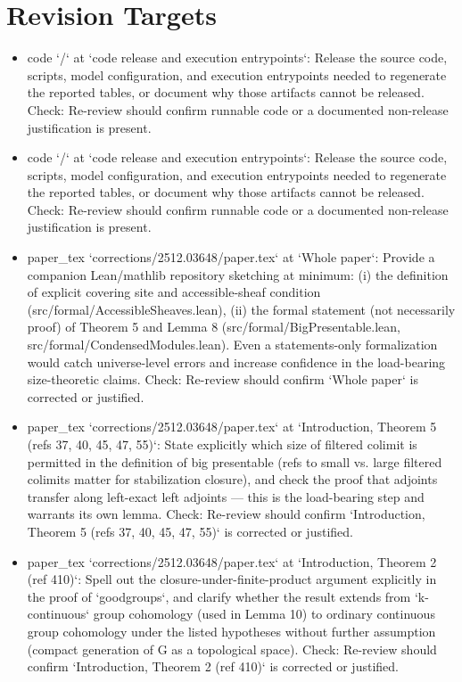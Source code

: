 \documentclass[11pt]{article}
\begin{document}
\section*{Revision Targets}
\begin{itemize}[leftmargin=*]
  \item [open] code `/` at `code release and execution entrypoints`: Release the source code, scripts, model configuration, and execution entrypoints needed to regenerate the reported tables, or document why those artifacts cannot be released. Check: Re-review should confirm runnable code or a documented non-release justification is present.
  \item [open] code `/` at `code release and execution entrypoints`: Release the source code, scripts, model configuration, and execution entrypoints needed to regenerate the reported tables, or document why those artifacts cannot be released. Check: Re-review should confirm runnable code or a documented non-release justification is present.
  \item [open] paper\_tex `corrections/2512.03648/paper.tex` at `Whole paper`: Provide a companion Lean/mathlib repository sketching at minimum: (i) the definition of explicit covering site and accessible-sheaf condition (src/formal/AccessibleSheaves.lean), (ii) the formal statement (not necessarily proof) of Theorem 5 and Lemma 8 (src/formal/BigPresentable.lean, src/formal/CondensedModules.lean). Even a statements-only formalization would catch universe-level errors and increase confidence in the load-bearing size-theoretic claims. Check: Re-review should confirm `Whole paper` is corrected or justified.
  \item [open] paper\_tex `corrections/2512.03648/paper.tex` at `Introduction, Theorem 5 (refs 37, 40, 45, 47, 55)`: State explicitly which size of filtered colimit is permitted in the definition of big presentable (refs to small vs. large filtered colimits matter for stabilization closure), and check the proof that adjoints transfer along left-exact left adjoints — this is the load-bearing step and warrants its own lemma. Check: Re-review should confirm `Introduction, Theorem 5 (refs 37, 40, 45, 47, 55)` is corrected or justified.
  \item [open] paper\_tex `corrections/2512.03648/paper.tex` at `Introduction, Theorem 2 (ref 410)`: Spell out the closure-under-finite-product argument explicitly in the proof of `goodgroups`, and clarify whether the result extends from `k-continuous` group cohomology (used in Lemma 10) to ordinary continuous group cohomology under the listed hypotheses without further assumption (compact generation of G as a topological space). Check: Re-review should confirm `Introduction, Theorem 2 (ref 410)` is corrected or justified.

\end{itemize}
\end{document}
